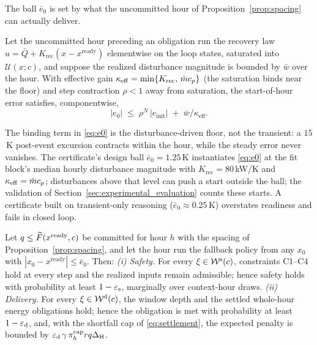 The ball $\bar e_0$ is set by what the uncommitted hour of
Proposition~\ref{prop:spacing} can actually deliver.

\begin{lemma}\label{lem:e0}
Let the uncommitted hour preceding an obligation run the recovery law
$u=\bar Q + K_{\mathrm{rec}}(x-x^{\mathrm{ready}})$ elementwise on the loop
states, saturated into $\mathcal{U}(x;c)$, and suppose the realized
disturbance magnitude is bounded by $\bar w$ over the hour. With effective
gain $\kappa_{\mathrm{eff}}=\min\{K_{\mathrm{rec}},\,\mdot c_p\}$ (the
saturation binds near the floor) and step contraction $\rho<1$ away from
saturation, the start-of-hour error satisfies, componentwise,
\begin{equation}
|e_0| \;\le\; \rho^{N}\,|e_{\mathrm{init}}|
 \;+\; \bar w/\kappa_{\mathrm{eff}} .
\label{eq:e0}
\end{equation}
\end{lemma}

The binding term in \eqref{eq:e0} is the disturbance-driven floor, not the
transient: a $15$\,K post-event excursion contracts within the hour, while
the steady error never vanishes. The certificate's design ball
$\bar e_0 = 1.25$\,K instantiates \eqref{eq:e0} at the fit block's median
hourly disturbance magnitude with $K_{\mathrm{rec}}=80$\,kW/K and
$\kappa_{\mathrm{eff}}=\mdot c_p$; disturbances above that level can push a
start outside the ball; the validation of
Section~\ref{sec:experimental_evaluation} counts these starts. A certificate built on
transient-only reasoning ($\bar e_0\approx 0.25$\,K) overstates readiness
and fails in closed loop.

\begin{theorem}\label{thm:main}
Let $q\le\widetilde{F}(x^{\mathrm{ready}},c)$ be committed for hour $h$ with the
spacing of Proposition~\ref{prop:spacing}, and let the hour run the fallback
policy from any $x_0$ with $|x_0-x^{\mathrm{ready}}|\le\bar e_0$. Then:
\emph{(i) Safety.} For every $\xi\in\mathcal{W}^{\mathrm{s}}(c)$, constraints C1--C4 hold at
every step and the realized inputs remain admissible; hence safety holds
with probability at least $1-\varepsilon_{\mathrm{s}}$, marginally over context-hour draws.
\emph{(ii) Delivery.} For every $\xi\in\mathcal{W}^{\mathrm{d}}(c)$, the window depth and the
settled whole-hour energy obligations hold; hence the obligation is met with
probability at least $1-\varepsilon_{\mathrm{d}}$, and, with the shortfall cap of
\eqref{eq:settlement}, the expected penalty is bounded by
$\varepsilon_{\mathrm{d}}\,\gamma\,\pi^{\mathrm{cap}}_h r q \Delta_{\mathrm{H}}$.
\end{theorem}

